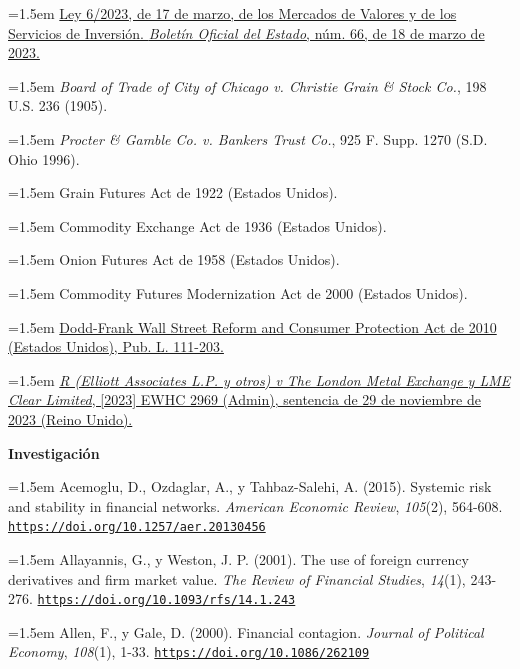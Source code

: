 \documentclass[10pt,a4paper]{article}
\begin{document}
\noindent\hangindent=1.5em \href{https://www.boe.es/eli/es/l/2023/03/17/6}{Ley 6/2023, de 17 de marzo, de los Mercados de Valores y de los Servicios de Inversión. \textit{Boletín Oficial del Estado}, núm. 66, de 18 de marzo de 2023.}

\noindent\hangindent=1.5em \textit{Board of Trade of City of Chicago v. Christie Grain \& Stock Co.}, 198 U.S. 236 (1905).

\noindent\hangindent=1.5em \textit{Procter \& Gamble Co. v. Bankers Trust Co.}, 925 F. Supp. 1270 (S.D. Ohio 1996).

\noindent\hangindent=1.5em Grain Futures Act de 1922 (Estados Unidos).

\noindent\hangindent=1.5em Commodity Exchange Act de 1936 (Estados Unidos).

\noindent\hangindent=1.5em Onion Futures Act de 1958 (Estados Unidos).

\noindent\hangindent=1.5em Commodity Futures Modernization Act de 2000 (Estados Unidos).

\noindent\hangindent=1.5em \href{https://www.govinfo.gov/app/details/PLAW-111publ203}{Dodd-Frank Wall Street Reform and Consumer Protection Act de 2010 (Estados Unidos), Pub. L. 111-203.}

\noindent\hangindent=1.5em \href{https://caselaw.nationalarchives.gov.uk/ewhc/admin/2023/2969}{\textit{R (Elliott Associates L.P. y otros) v The London Metal Exchange y LME Clear Limited}, [2023] EWHC 2969 (Admin), sentencia de 29 de noviembre de 2023 (Reino Unido).}

\textbf{Investigación}

\noindent\hangindent=1.5em Acemoglu, D., Ozdaglar, A., y Tahbaz-Salehi, A. (2015). Systemic risk and stability in financial networks. \textit{American Economic Review}, \textit{105}(2), 564-608. \href{https://doi.org/10.1257/aer.20130456}{\nolinkurl{https://doi.org/10.1257/aer.20130456}}

\noindent\hangindent=1.5em Allayannis, G., y Weston, J. P. (2001). The use of foreign currency derivatives and firm market value. \textit{The Review of Financial Studies}, \textit{14}(1), 243-276. \href{https://doi.org/10.1093/rfs/14.1.243}{\nolinkurl{https://doi.org/10.1093/rfs/14.1.243}}

\noindent\hangindent=1.5em Allen, F., y Gale, D. (2000). Financial contagion. \textit{Journal of Political Economy}, \textit{108}(1), 1-33. \href{https://doi.org/10.1086/262109}{\nolinkurl{https://doi.org/10.1086/262109}}
\end{document}
